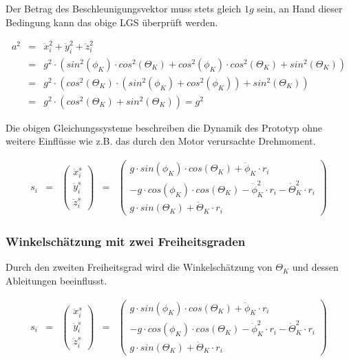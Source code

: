 \documentclass{article}
\begin{document}
Der Betrag des Beschleunigungsvektor muss stets gleich $1g$ sein, an Hand dieser Bedingung kann das obige LGS überprüft werden.

\begin{equation}
\begin{array}{lcl}
a^2 
& = &
\ddot{x}^2_i + \ddot{y}^2_i + \ddot{z}^2_i \\
 & = &
g^2 \cdot ( sin^2(\phi_K) \cdot cos^2(\Theta_K) + cos^2(\phi_K) \cdot cos^2(\Theta_K) + sin^2(\Theta_K) ) \\
& = &
g^2 \cdot ( cos^2(\Theta_K) \cdot (sin^2(\phi_K) + cos^2(\phi_K) ) + sin^2(\Theta_K) ) \\
& = &
g^2 \cdot (cos^2(\Theta_K) + sin^2(\Theta_K)) = g^2
\end{array}
\end{equation}

Die obigen Gleichungssysteme beschreiben die Dynamik des Prototyp ohne weitere Einflüsse wie z.B. das durch den Motor verursachte Drehmoment.

\begin{equation}
\begin{array}{lclcl}
s_i 
& = & 
\begin{pmatrix} \ddot{x}^s_i \\ \ddot{y}^s_i \\ \ddot{z}^s_i \end{pmatrix}
& = &
\begin{pmatrix} 
g \cdot sin(\phi_K) \cdot cos(\Theta_K) + \ddot{\phi}_K \cdot r_i \\
-g \cdot cos(\phi_K) \cdot cos(\Theta_K) - \dot{\phi}^2_K \cdot r_i - \dot{\Theta}^2_K \cdot r_i \\
g \cdot sin(\Theta_K) + \ddot{\Theta}_K \cdot r_i
\end{pmatrix}
\end{array}
\end{equation}

\subsubsection{Winkelschätzung mit zwei Freiheitsgraden}
Durch den zweiten Freiheitsgrad wird die Winkelschätzung von $\Theta_K$ und dessen Ableitungen beeinflusst. 

\begin{equation}
\begin{array}{lclcl}
s_i 
& = & 
\begin{pmatrix} \ddot{x}^s_i \\ \ddot{y}^s_i \\ \ddot{z}^s_i \end{pmatrix}
& = &
\begin{pmatrix} 
g \cdot sin(\phi_K) \cdot cos(\Theta_K) + \ddot{\phi}_K \cdot r_i \\
-g \cdot cos(\phi_K) \cdot cos(\Theta_K) - \dot{\phi}^2_K \cdot r_i - \dot{\Theta}^2_K \cdot r_i \\
g \cdot sin(\Theta_K) + \ddot{\Theta}_K \cdot r_i
\end{pmatrix}
\end{array}
\end{equation}
\end{document}
